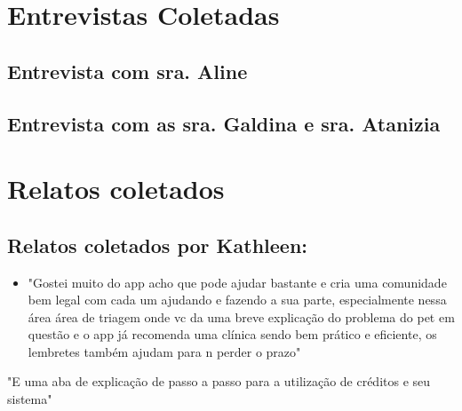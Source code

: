 



\section{Entrevistas Coletadas}
\subsection{Entrevista com sra. Aline}


\subsection{Entrevista com as sra. Galdina e sra. Atanizia}


\section{Relatos coletados}
\subsection{Relatos coletados por Kathleen:}

\begin{itemize}
\item "Gostei muito do app acho que pode ajudar bastante e cria uma comunidade bem legal com cada um ajudando e fazendo a sua parte, especialmente nessa área área de triagem onde vc da uma breve explicação do problema do pet em questão e o app já recomenda uma clínica sendo bem prático e eficiente, os lembretes também ajudam para n perder o prazo"
\end{itemize}


"E uma aba de explicação de passo a passo para a utilização de créditos e seu sistema"

